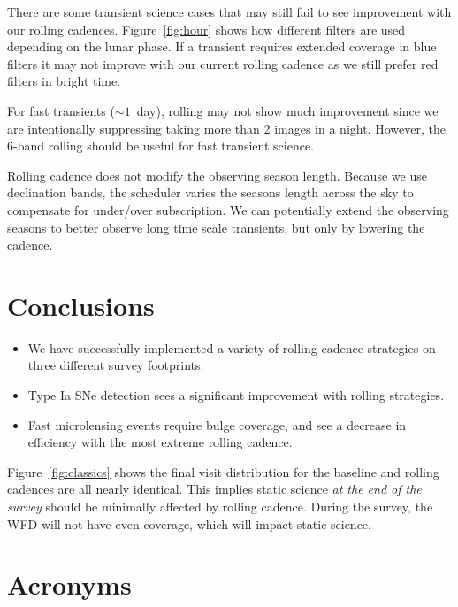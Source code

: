 \documentclass[modern]{aastex62}
\begin{document}
There are some transient science cases that may still fail to see improvement with our rolling cadences. Figure~\ref{fig:hour} shows how different filters are used depending on the lunar phase. If a transient requires extended coverage in blue filters it may not improve with our current rolling cadence as we still prefer red filters in bright time.

For fast transients ($\sim 1$\ day), rolling may not show much improvement since we are intentionally suppressing taking more than 2 images in a night. However, the 6-band rolling should be useful for fast transient science.

Rolling cadence does not modify the observing season length. Because we use declination bands, the scheduler varies the seasons length across the sky to compensate for under/over subscription. We can potentially extend the observing seasons to better observe long time scale transients, but only by lowering the cadence. 



\section{Conclusions}

\begin{itemize}
    \item{We have successfully implemented a variety of rolling cadence strategies on three different survey footprints.}
    \item{Type Ia SNe detection sees a significant improvement with rolling strategies.}
    \item{Fast microlensing events require bulge coverage, and see a decrease in efficiency with the most extreme rolling cadence.}
\end{itemize}


Figure~\ref{fig:classics} shows the final visit distribution for the baseline and rolling cadences are all nearly identical. This implies static science {\emph{at the end of the survey}} should be minimally affected by rolling cadence. During the survey, the WFD will not have even coverage, which will impact static science.






\section{Acronyms} \label{sec:acronyms}

\end{document}

